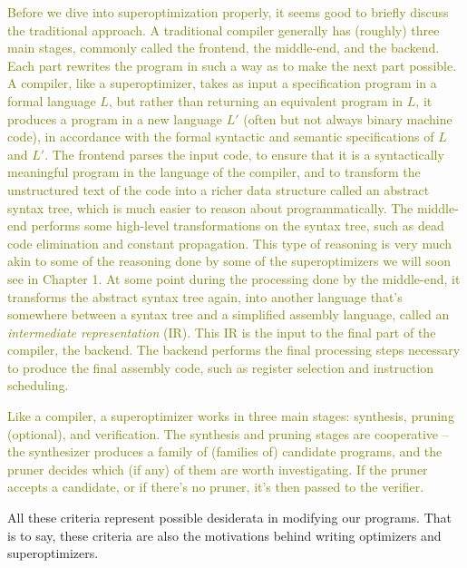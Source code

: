 \documentclass[12pt,twoside]{reedthesis}
\newcommand{\green}[1]{\textcolor{olive}{#1}}
\begin{document}
    \green{
    Before we dive into superoptimization properly, it seems good to briefly discuss the traditional approach\footnotemark.
    A traditional compiler generally has (roughly) three main stages, commonly called the frontend, the middle-end, and the backend.
    Each part rewrites the program in such a way as to make the next part possible.
    A compiler, like a superoptimizer, takes as input a specification program in a formal language $L$, but rather than returning an equivalent program in $L$, it produces a program in a new language $L'$ (often but not always binary machine code), in accordance with the formal syntactic and semantic specifications of $L$ and $L'$.
    The frontend parses the input code, to ensure that it is a syntactically meaningful program in the language of the compiler, and to transform the unstructured text of the code into a richer data structure called an abstract syntax tree, which is much easier to reason about programmatically.
    The middle-end performs some high-level transformations on the syntax tree, such as dead code elimination and constant propagation.
    This type of reasoning is very much akin to some of the reasoning done by some of the superoptimizers we will soon see in Chapter 1. 
    At some point during the processing done by the middle-end, it transforms the abstract syntax tree again, into another language that's somewhere between a syntax tree and a simplified assembly language, called an \textit{intermediate representation} (IR).
    This IR is the input to the final part of the compiler, the backend.
    The backend performs the final processing steps necessary to produce the final assembly code, such as register selection and instruction scheduling.
    }
    

    \green{
    Like a compiler, a superoptimizer works in three main stages: synthesis, pruning (optional), and verification.
    The synthesis and pruning stages are cooperative -- the synthesizer produces a family of (families of) candidate programs, and the pruner decides which (if any) of them are worth investigating.
    If the pruner accepts a candidate, or if there's no pruner, it's then passed to the verifier. 
    }
    
    All these criteria represent possible desiderata in modifying our programs.
    That is to say, these criteria are also the motivations behind writing optimizers and superoptimizers. 
    
\end{document}

